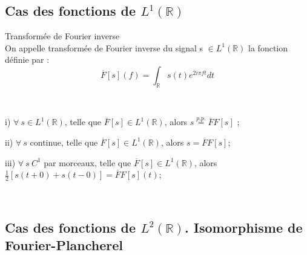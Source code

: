 \subsection{Cas des fonctions de $L^1(\mathbb{R})$}
\begin{definition}
Transformée de Fourier inverse\\
On appelle transformée de Fourier inverse du signal s $\in L^1(\mathbb{R})$ la fonction définie par :
$$\overline{F}[s](f)=\int_\mathbb{R}s(t)e^{2i\pi ft}dt$$
\end{definition}

\begin{thme}
~~\
\begin{description}
\item i) $\forall\ s \in L^1(\mathbb{R})$, telle que $\overline{F}[s] \in L^1(\mathbb{R})$, alors $s \stackrel{p.p.}{=} \overline{F}F[s]$ ;
\item ii) $\forall\ s$ continue, telle que $\overline{F}[s] \in L^1(\mathbb{R})$, alors $s = \overline{F}F[s]$;
\item iii) $\forall\ s\ C^1$ par morceaux, telle que $\overline{F}[s] \in L^1(\mathbb{R})$, alors $\frac{1}{2}[s(t+0)+s(t-0)] = \overline{F}F[s](t)$;
\end{description}
\end{thme}
~~\\

\subsection{Cas des fonctions de $L^2(\mathbb{R})$. Isomorphisme de Fourier-Plancherel}

